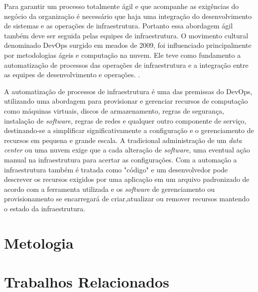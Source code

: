 Para garantir um processo totalmente ágil e que acompanhe as exigências do negócio da organização é necessário que haja uma integração do desenvolvimento de sistemas e as operações de infraestrutura. Portanto essa abordagem ágil também deve ser seguida pelas equipes de infraestrutura.
O movimento cultural denominado DevOps surgido em meados de 2009, foi influenciado principalmente por metodologias ágeis e computação na nuvem. Ele teve como fundamento a automatização de processos das operações de infraestrutura e a integração entre as equipes de desenvolvimento e operações. \cite{sato}.

A automatização de processos de infraestrutura é uma das premissas do DevOps, utilizando uma abordagem para provisionar e gerenciar recursos de computação como máquinas virtuais, discos de armazenamento, regras de segurança, instalação de \textit{software}, regras de redes e qualquer outro componente de serviço, destinando-se a simplificar significativamente a configuração e o gerenciamento de recursos em pequena e grande escala. A tradicional administração de um \textit{data center} ou uma nuvem exige que a cada alteração de \textit{software}, uma eventual ação manual na infraestrutura para acertar as configurações. Com a automação a infraestrutura também é tratada como "código" e um desenvolvedor pode descrever os recursos exigidos por uma aplicação em um arquivo padronizado de acordo com a ferramenta utilizada e os \textit{software} de gerenciamento ou provisionamento se encarregará de criar,atualizar ou remover recursos mantendo o estado da infraestrutura. 

\section{\esp Metologia}


\section{\esp Trabalhos Relacionados} \label{relacionados}


